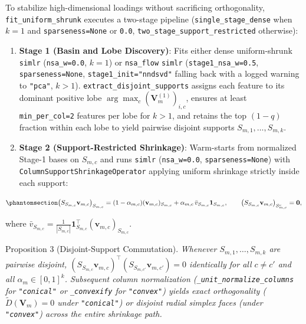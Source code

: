 \documentclass[
  10pt,
  letterpaper,
]{report}
\providecommand{\tightlist}{%
  \setlength{\itemsep}{0pt}\setlength{\parskip}{0pt}}
\begin{document}
To stabilize high-dimensional loadings without sacrificing
orthogonality, \texttt{fit\_uniform\_shrunk} executes a two-stage
pipeline (\texttt{single\_stage\_dense} when \(k = 1\) and
\texttt{sparseness=None} or \texttt{0.0},
\texttt{two\_stage\_support\_restricted} otherwise):

\begin{enumerate}
\def\labelenumi{\arabic{enumi}.}
\tightlist
\item
  \textbf{Stage 1 (Basin and Lobe Discovery)}: Fits either dense
  uniform-shrunk \texttt{simlr} (\texttt{nsa\_w=0.0}, \(k = 1\)) or
  \texttt{nsa\_flow} \texttt{simlr} (\texttt{stage1\_nsa\_w=0.5},
  \texttt{sparseness=None}, \texttt{stage1\_init="nndsvd"} falling back
  with a logged warning to \texttt{"pca"}, \(k > 1\)).
  \texttt{extract\_disjoint\_supports} assigns each feature to its
  dominant positive lobe \(\arg\max_c (\mathbf{V}_m^{(1)})_{i,c}\),
  ensures at least \texttt{min\_per\_col=2} features per lobe for
  \(k > 1\), and retains the top \((1 - q)\) fraction within each lobe
  to yield pairwise disjoint supports \(S_{m,1}, \dots, S_{m,k}\).
\item
  \textbf{Stage 2 (Support-Restricted Shrinkage)}: Warm-starts from
  normalized Stage-1 bases on \(S_{m,c}\) and runs \texttt{simlr}
  (\texttt{nsa\_w=0.0}, \texttt{sparseness=None}) with
  \texttt{ColumnSupportShrinkageOperator} applying uniform shrinkage
  strictly inside each support:
\end{enumerate}

\begin{equation}\protect\phantomsection\label{eq-prop3-support-shrinkage}{
\bigl(S_{S_{m,c}}\mathbf{v}_{m,c}\bigr)_{S_{m,c}} = (1 - \alpha_{m,c})(\mathbf{v}_{m,c})_{S_{m,c}} + \alpha_{m,c}\,\bar{v}_{S_{m,c}}\mathbf{1}_{S_{m,c}}, \qquad \bigl(S_{S_{m,c}}\mathbf{v}_{m,c}\bigr)_{S_{m,c}^c} = \mathbf{0},
}\end{equation}

where
\(\bar{v}_{S_{m,c}} = \frac{1}{|S_{m,c}|}\mathbf{1}_{S_{m,c}}^\top (\mathbf{v}_{m,c})_{S_{m,c}}\).

Proposition 3 (Disjoint-Support Commutation). \emph{Whenever
\(S_{m,1}, \dots, S_{m,k}\) are pairwise disjoint,
\((S_{S_{m,c}}\mathbf{v}_{m,c})^\top (S_{S_{m,c'}}\mathbf{v}_{m,c'}) = 0\)
identically for all \(c \neq c'\) and all \(\alpha_m \in [0, 1]^k\).
Subsequent column normalization (\texttt{\_unit\_normalize\_columns} for
\texttt{"conical"} or \texttt{\_convexify} for \texttt{"convex"}) yields
exact orthogonality (\(\tilde{D}(\mathbf{V}_m) = 0\) under
\texttt{"conical"}) or disjoint radial simplex faces (under
\texttt{"convex"}) across the entire shrinkage path.}
\end{document}
